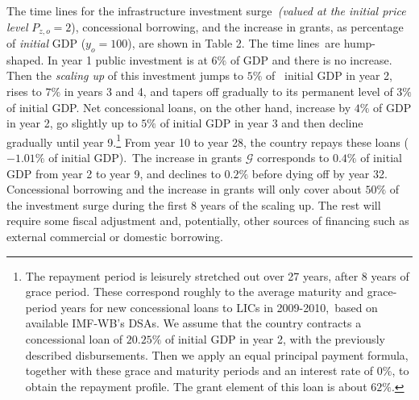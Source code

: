 \documentclass[11pt]{article}
\begin{document}
The time lines for the infrastructure investment surge\textit{\ (valued at
the initial price level }$P_{z,o}=2$), concessional borrowing, and the
increase in grants, as percentage of \textit{initial} GDP ($y_{o}=100$), are
shown in Table 2. The time lines\ are hump-shaped. In year 1 public
investment is at $6\%$ of GDP and there is no increase. Then the \textit{%
scaling up} of this investment jumps to $5\%$ of \ initial GDP in year 2,
rises to $7\%$ in years 3 and 4, and tapers off gradually to its permanent
level of $3\%$ of initial GDP. Net concessional loans, on the other hand,
increase by $4\%$ of GDP in year 2, go slightly up to $5\%$ of initial GDP
in year 3 and then decline gradually until year 9.\footnote{%
The repayment period is leisurely stretched out over 27 years, after 8 years
of grace period. These correspond roughly to the average maturity and
grace-period years for new concessional loans to LICs in 2009-2010,\ based
on available IMF-WB's DSAs. We assume that the country contracts a
concessional loan of $20.25\%$ of initial GDP in year 2, with the previously
described disbursements. Then we apply an equal principal payment formula,
together with these grace and maturity periods and an interest rate of 0\%,
to obtain the repayment profile. The grant element of this loan is about $%
62\%$.} From year 10 to year 28, the country repays these loans ($-1.01\%$
of initial GDP).\ The increase in grants $\mathcal{G}$ corresponds to $0.4\%$
of initial GDP from year 2 to year 9, and declines to $0.2\%$ before dying
off by year 32. Concessional borrowing and the increase in grants will only
cover about $50\%$ of the investment surge during the first 8 years of the
scaling up. The rest will require some fiscal adjustment and, potentially,
other sources of financing such as external commercial or domestic borrowing.
\end{document}

